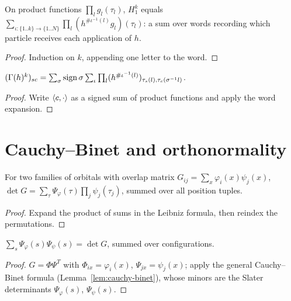 \begin{theorem}
  \label{thm:H1_iter_prod}
  \leanok
  On product functions $\prod_lg_l(\tau_l)$,
  $H_1^k$ equals $\sum_{\iota:\{1..k\}\to\{1..N\}}\prod_l(h^{\#\iota^{-1}(l)}g_l)(\tau_l)$: a sum over words
  recording which particle receives each application of $h$.
\end{theorem}
\begin{proof}
  \leanok
  Induction on $k$, appending one letter to the word.
\end{proof}

\begin{theorem}
  \label{thm:gamma_pow_formula}
  \leanok
  $(\Gamma(h)^k)_{sc}=\sum_\sigma\operatorname{sign}\sigma\sum_\iota\prod_l(h^{\#\iota^{-1}(l)})_{\tau_s(l),\tau_c(\sigma^{-1}l)}$.
\end{theorem}
\begin{proof}
  \leanok
  Write $\langle c, \cdot\rangle$ as a signed sum of product functions and apply the word expansion.
\end{proof}

\section{Cauchy--Binet and orthonormality}

\begin{lemma}
  \label{lem:det_gram}
  \leanok
  For two families of orbitals with overlap matrix $G_{ij}=\sum_x\varphi_i(x)\psi_j(x)$,
  $\det G=\sum_\tau\Psi_\varphi(\tau)\prod_j\psi_j(\tau_j)$, summed over all position tuples.
\end{lemma}
\begin{proof}
  \leanok
  Expand the product of sums in the Leibniz formula, then reindex the permutations.
\end{proof}

\begin{theorem}
  \label{thm:cauchy_binet}
  \leanok
  $\sum_s\Psi_\varphi(s)\Psi_\psi(s)=\det G$, summed over configurations.
\end{theorem}
\begin{proof}
  \leanok
  $G=\Phi\Psi^T$ with $\Phi_{ix}=\varphi_i(x)$, $\Psi_{jx}=\psi_j(x)$; apply the general Cauchy--Binet formula
  (Lemma~\ref{lem:cauchy-binet}), whose minors are the Slater determinants $\Psi_\varphi(s)$, $\Psi_\psi(s)$.
\end{proof}

